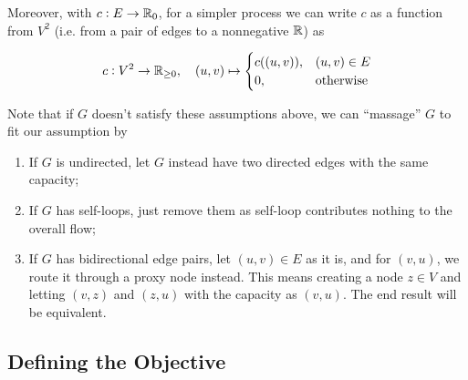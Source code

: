 Moreover, with $c:E\to\mathbb{{R}}_0$, for a simpler process we can write $c$ as a function from $V^2$ (i.e. from a pair of edges to a nonnegative $\mathbb{{R}}$) as

\begin{equation}
    c: V^2 \to \mathbb{{R}}_{\ge 0}, \quad (u,v) \mapsto \begin{cases}
        c((u,v)), & (u,v)\in E \\
        0,& \text{otherwise}
    \end{cases}
\end{equation}

Note that if $G$ doesn't satisfy these assumptions above, we can ``massage'' $G$ to fit our assumption by

\begin{enumerate}
    \item If $G$ is undirected, let $G$ instead have two directed edges with the same capacity; 
    \item If $G$ has self-loops, just remove them as self-loop contributes nothing to the overall flow;
    \item If $G$ has bidirectional edge pairs, let $(u,v)\in E$ as it is, and for $(v,u)$, we route it through a proxy node instead.
    This means creating a node $z \in V$ and letting $(v,z)$ and $(z,u)$ with the capacity as $(v,u)$.
    The end result will be equivalent. 
\end{enumerate}

\subsection{Defining the Objective}

